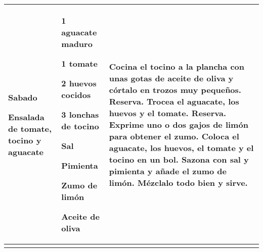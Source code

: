\documentclass[menu.tex]{subfiles}
\begin{document}
\begin{tabular} {p{3.5cm} p{4cm} p{9cm}}
\pbox{20cm}
{
    \rule{0pt}{3ex}\begin{large}\textbf{Sabado}\end{large}\\ 
    \rule{0pt}{2ex}Ensalada de tomate,\\ tocino y aguacate
} & 
\vspace{-0.6cm}
\begin{compactitem} 
    \begin{footnotesize}
        \item 1 aguacate maduro
        \item 1 tomate
        \item 2 huevos cocidos
        \item 3 lonchas de tocino
        \item Sal
        \item Pimienta
        \item Zumo de limón
        \item Aceite de oliva
    \end{footnotesize}
\end{compactitem}&
\vspace{-0.6cm}
Cocina el tocino a la plancha con unas gotas de aceite de oliva y córtalo en trozos muy pequeños. Reserva.
Trocea el aguacate, los huevos y el tomate. Reserva.
Exprime uno o dos gajos de limón para obtener el zumo.
Coloca el aguacate, los huevos, el tomate y el tocino en un bol.
Sazona con sal y pimienta y añade el zumo de limón.
Mézclalo todo bien y sirve.\\
\hline

\newpage        
\end{tabular}
\end{document}
